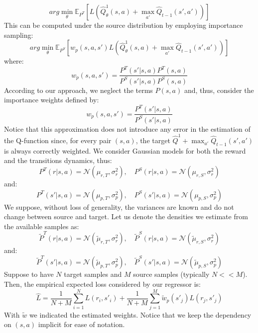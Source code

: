       \begin{equation}
        arg\min_{\theta} \mathbb{E}_{P^{T}} \left [ L(\hat{Q}_{\theta}^{1} (s,a) + \max_{a'} \hat{Q}_{t-1}(s',a')) \right ]
      \end{equation}
      \noindent This can be computed under the source distribution by employing importance sampling:
      \begin{equation}
        arg\min_{\theta} \mathbb{E}_{P^{S}} \left [ w_{p}(s,a,s') L(\hat{Q}_{\theta}^{1} (s,a) + \max_{a'} \hat{Q}_{t-1}(s',a')) \right ]
      \end{equation}
      where:
      \begin{equation}
        w_{p}(s,a,s') = \frac{P^{T}(s'|s,a) P^{T}(s,a)}{P^{S}(s'|s,a)P^{S}(s,a)}
      \end{equation}
      According to our approach, we neglect the terms $P(s,a)$ and, thus, consider the importance weights defined by:
      \begin{equation}
        w_{p}(s,a,s') = \frac{P^{T}(s'|s,a)}{P^{S}(s'|s,a)}
      \end{equation}
      Notice that this approximation does not introduce any error in the estimation of the Q-function since,
      for every pair $(s,a)$, the target $\hat{Q}^{1} + \max_{a'}\hat{Q}_{t-1}(s',a')$ is always correctly
      weighted.\newline
      \noindent We consider Gaussian models for both the reward and the transitions dynamics, thus:
      \begin{equation}
        P^{T}(r|s,a) = \mathcal{N}(\mu_{r,T}, \sigma_{r}^{2}), \quad P^{S}(r|s,a) = \mathcal{N}(\mu_{r,S}, \sigma^{2}_{r})
      \end{equation}
      and:
      \begin{equation}
        P^{T}(s'|s,a) = \mathcal{N}(\mu_{p,T}, \sigma_{p}^{2}), \quad P^{S}(s'|s,a) = \mathcal{N}(\mu_{p,S}, \sigma^{2}_{p})
      \end{equation}
      We suppose, without loss of generality, the variances are known and do not change between source and target. Let us
      denote the densities we estimate from the available samples as:
      \begin{equation}
        \tilde{P}^{T}(r|s,a) = \mathcal{N}(\tilde{\mu}_{r,T}, \sigma^{2}_{r}), \quad \tilde{P}^{S}(r|s,a) = \mathcal{N}(\tilde{\mu}_{r,S}, \sigma^{2}_{r})
      \end{equation}
      and:
      \begin{equation}
        \tilde{P}^{T}(s'|s,a) = \mathcal{N}(\tilde{\mu}_{p,T}, \sigma^{2}_{p}), \quad \tilde{P}^{S}(s'|s,a) = \mathcal{N}(\tilde{\mu}_{p,S}, \sigma^{2}_{p})
      \end{equation}
      Suppose to have $N$ target samples and $M$ source samples (typically $N << M$). Then, the empirical expected loss considered by
      our regressor is:
      \begin{equation}
        \hat{L} = \frac{1}{N+M}\sum_{i=1}^{N} L(r_i,s'_i) + \frac{1}{N+M} \sum_{j=1}^{M} \tilde{w}_{p}(s'_j)L(r_j, s'_j)
      \end{equation}
      With $\tilde{w}$ we indicated the estimated weights. Notice that we keep the dependency on $(s,a)$ implicit for ease of
      notation.


